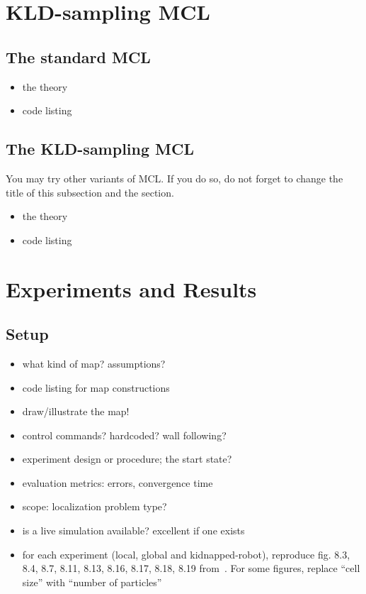 \documentclass[letterpaper, 10 pt, conference]{ieeeconf}  %
\begin{document}
\section{KLD-sampling MCL}
\subsection{The standard MCL}
\begin{itemize}
\item the theory
\item code listing
\end{itemize}

\subsection{The KLD-sampling MCL}
You may try other variants of MCL.
If you do so, do not forget to change the title of this subsection and the section.
\begin{itemize}
\item the theory
\item code listing
\end{itemize}

\section{Experiments and Results}

\subsection{Setup}
\begin{itemize}
    \item what kind of map? assumptions?
    \item code listing for map constructions
    \item draw/illustrate the map!
    \item control commands? hardcoded? wall following?
    \item experiment design or procedure; the start state?
    \item evaluation metrics: errors, convergence time
    \item scope: localization problem type?
    \item is a live simulation available? excellent if one exists
    \item for each experiment (local, global and kidnapped-robot), reproduce fig. 8.3, 8.4, 8.7, 8.11, 8.13, 8.16, 8.17, 8.18, 8.19 from~\cite{Thrun:2005:PR}. For some figures, replace ``cell size'' with ``number of particles''
\end{itemize}
\end{document}
